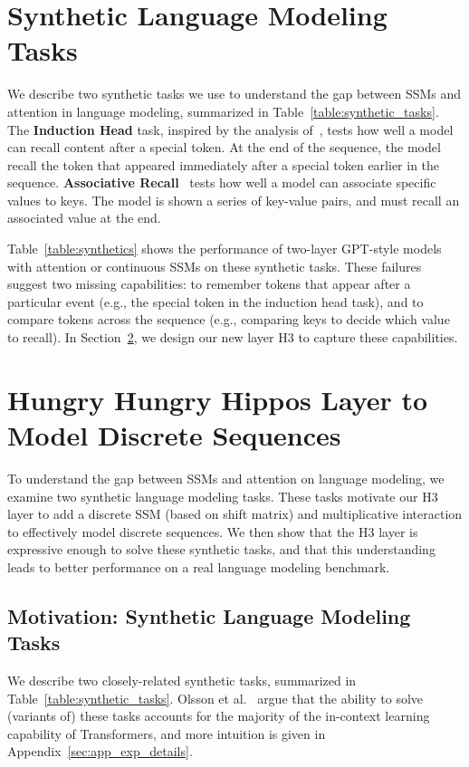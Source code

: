 \section{Synthetic Language Modeling Tasks}

We describe two synthetic tasks we use to understand the gap between SSMs and attention in language modeling, summarized in Table~\ref{table:synthetic_tasks}. The \textbf{Induction Head} task, inspired by the analysis of~\citet{olsson2022context}, tests how well a model can recall content after a special token. At the end of the sequence, the model recall the token that appeared immediately after a special token earlier in the sequence. \textbf{Associative Recall}~\citep{ba2016using} tests how well a model can associate specific values to keys. The model is shown a series of key-value pairs, and must recall an associated value at the end.

Table~\ref{table:synthetics} shows the performance of two-layer GPT-style models with attention or continuous SSMs on these synthetic tasks. These failures suggest two missing capabilities: to remember tokens that appear after a particular event (e.g., the special token in the induction head task), and to compare tokens across the sequence (e.g., comparing keys to decide which value to recall). In Section~\ref{sec:method}, we design our new layer \textsc{H3} to capture these capabilities.

\section{Hungry Hungry Hippos Layer to Model Discrete Sequences}
\label{sec:method}

To understand the gap between SSMs and attention on language modeling, we examine two synthetic language modeling tasks. These tasks motivate our \textsc{H3} layer to add a discrete SSM (based on shift matrix) and multiplicative interaction to effectively model discrete sequences. We then show that the \textsc{H3} layer is expressive enough to solve these synthetic tasks, and that this understanding leads to better performance on a real language modeling benchmark.

\subsection{Motivation: Synthetic Language Modeling Tasks\label{sec:synthetics}}

We describe two closely-related synthetic tasks, summarized in Table~\ref{table:synthetic_tasks}. 
Olsson et al.~\citep{olsson2022context} argue that the ability to solve (variants of) these tasks accounts for the majority of the in-context learning capability of Transformers, and more intuition is given in Appendix~\ref{sec:app_exp_details}. 

